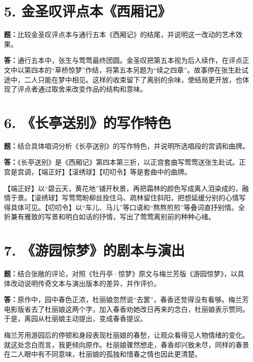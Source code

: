 \documentclass[11pt,a4paper,fontset=windows]{ctexart}
\newenvironment{answer}{\par\begingroup\answerlatin\answercjk}{\par\endgroup}
\begin{document}
\section*{5. 金圣叹评点本《西厢记》}

\textbf{题：}比较金圣叹评点本与通行五本《西厢记》的结尾，并说明这一改动的艺术效果。

\begin{answer}
\textbf{答：}通行五本中，张生与莺莺最终团圆。金圣叹把第五本视为后人续作，在评点正文中以第四本的“草桥惊梦”作结，将第五本另题为“续之四章”。故事停在张生赴试途中，二人只能在梦中相见。这样的收束留下了离别的余味，使结局更开放，也体现了评点者通过取舍来改变作品的结构和意味。

\end{answer}
\section*{6. 《长亭送别》的写作特色}

\textbf{题：}结合具体唱词分析《长亭送别》的写作特色，并说明所选唱段的宫调和曲牌。

\begin{answer}
\textbf{答：}《长亭送别》是《西厢记》第四本第三折，以正宫套曲写莺莺送张生赴试。正宫是宫调，【端正好】【滚绣球】【叨叨令】等是套曲中的曲牌。

【端正好】以“碧云天，黄花地”铺开秋景，再把霜林的颜色写成离人泪染成的，融情于景。【滚绣球】写莺莺盼柳丝拴住马、疏林留住斜阳，把想延缓分别的心情写得具体可见。【叨叨令】以“车儿、马儿”等口语和“熬熬煎煎”等叠词直抒别情。全折兼有雅致的写景和明白如话的抒情，写出了莺莺离别前的种种心绪。

\end{answer}
\section*{7. 《游园惊梦》的剧本与演出}

\textbf{题：}结合张敞的评论，对照《牡丹亭·惊梦》原文与梅兰芳版《游园惊梦》，以具体改动说明传奇文本与演出版本的差异，并作评价。

\begin{answer}
\textbf{答：}原作中，园中春色正浓，杜丽娘忽然说“去罢”，春香还觉得没有看够。梅兰芳电影版省去了杜丽娘这两个字，加入春香劝她改日再来的念白，杜丽娘表示赞同。于是，离园从杜丽娘主动提出，变成春香提议。

梅兰芳用游园后的停顿和身段表现杜丽娘的春愁，让观众看得见人物情绪的变化。就这处念白而言，我更倾向原作。杜丽娘骤然想走，春香却兴致未尽，同样的春景在二人眼中有不同意味，杜丽娘的孤独和惜春之情也因此更清楚。

\end{answer}
\end{document}
